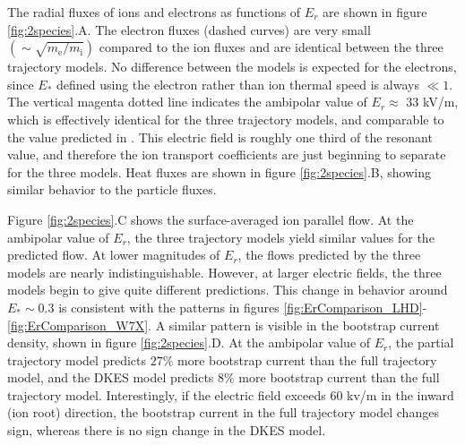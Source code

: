 \documentclass[12pt]{revtex4}
\newcommand{\me}{m_{\mathrm{e}}}
\newcommand{\mi}{m_{\mathrm{i}}}
\begin{document}
The radial fluxes of ions and electrons as functions of $E_r$ are shown in figure \ref{fig:2species}.A.
The electron fluxes (dashed curves) are very small $(\sim \sqrt{\me/\mi})$ compared to the ion fluxes
and are identical between the three trajectory models. No difference between the models is expected for
the electrons, since $E_*$ defined using the electron rather than ion thermal speed is always $\ll 1$.
The vertical magenta dotted line indicates the ambipolar value of $E_r \approx $ 33 kV/m, which is effectively
identical for the three trajectory models, and comparable to the value predicted in \cite{Turkin}.
This electric field is roughly one third of the resonant value, and therefore the ion transport coefficients are
just beginning to separate for the three models. Heat fluxes are shown in figure \ref{fig:2species}.B, showing similar
behavior to the particle fluxes.

Figure \ref{fig:2species}.C shows the surface-averaged ion parallel flow. At the ambipolar value of $E_r$,
the three trajectory models yield similar values for the predicted flow.
At lower magnitudes of $E_r$, the flows predicted by the three models are nearly indistinguishable.
However, at larger electric fields, the three models begin to give quite different predictions.
This change in behavior around $E_* \sim 0.3$ is consistent with the patterns in figures \ref{fig:ErComparison_LHD}- \ref{fig:ErComparison_W7X}.
A similar pattern is visible in the bootstrap current density, shown in figure \ref{fig:2species}.D.
At the ambipolar value of $E_r$, the partial trajectory model predicts
$27\%$ more bootstrap current than the full trajectory model,
and the DKES model predicts $8\%$ more bootstrap current than the full trajectory model.
Interestingly, if the electric field exceeds 60 kv/m in the inward (ion root) direction, the bootstrap current
in the full trajectory model changes sign, whereas there is no sign change in the DKES model.
\end{document}
